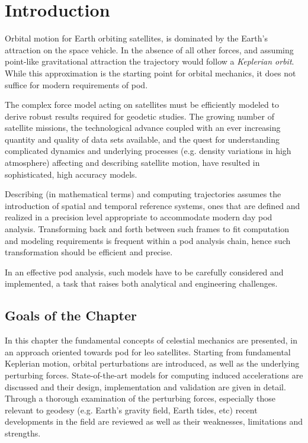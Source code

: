 \section{Introduction}\label{sec:astro-introduction}

Orbital motion for Earth orbiting satellites, is dominated by the Earth's attraction on 
the space vehicle. In the absence of all other forces, and assuming point-like 
gravitational attraction the trajectory would follow a \emph{Keplerian orbit}. While 
this approximation is the starting point for orbital mechanics, it does not suffice 
for modern requirements of \gls{pod}.

The complex force model acting on satellites must be efficiently modeled to derive 
robust results required for geodetic studies. The growing number of satellite missions, 
the technological advance coupled with an ever increasing quantity and quality of 
data sets available, and the quest for understanding complicated 
dynamics and underlying processes (e.g. density variations in high atmosphere) 
affecting and describing satellite motion, have resulted in sophisticated, high accuracy 
models.

Describing (in mathematical terms) and computing trajectories assumes the 
introduction of spatial and temporal reference systems, ones that are defined and 
realized in a precision level appropriate to accommodate modern day \gls{pod} 
analysis. Transforming back and forth between such frames to fit computation and 
modeling requirements is frequent within a \gls{pod} analysis chain, hence 
such transformation should be efficient and precise.

In an effective \gls{pod} analysis, such models have to be carefully considered 
and implemented, a task that raises both analytical and engineering challenges. 

\subsection{Goals of the Chapter}\label{sec:astro-goals}

In this chapter the fundamental concepts of celestial mechanics are presented, in an approach oriented 
towards \gls{pod} for \gls{leo} satellites. Starting from fundamental Keplerian motion, 
orbital perturbations are introduced, as well as the underlying perturbing forces. 
State-of-the-art models for computing induced accelerations are discussed and their 
design, implementation and validation are given in detail. Through a thorough 
examination of the perturbing forces, especially those relevant to geodesy (e.g. 
Earth's gravity field, Earth tides, etc) recent developments in the field are 
reviewed as well as their weaknesses, limitations and strengths.

